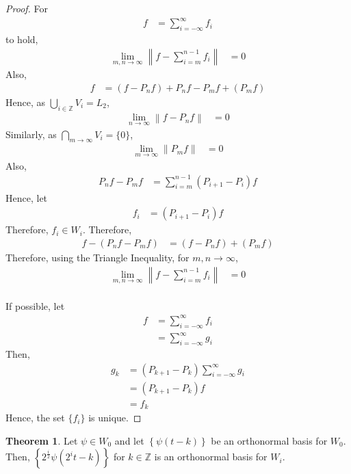 \documentclass[titlepage, fleqn, a4paper, 12pt, twoside]{article}
\theoremstyle{definition}
\theoremstyle{theorem}
\newtheorem{theorem}{Theorem}
\begin{document}
\begin{proof}
	For
	\begin{align*}
		f &= \sum\limits_{i = -\infty}^{\infty} f_i
	\end{align*}
	to hold,
	\begin{align*}
		\lim\limits_{m, n \to \infty} \left\| f - \sum\limits_{i = m}^{n - 1} f_i \right\| &= 0
	\end{align*}
	Also,
	\begin{align*}
		f &= (f - P_n f) + P_n f - P_m f + (P_m f)
	\end{align*}
	Hence, as $\bigcup_{i \in \mathbb{Z}} V_i = L_2$,
	\begin{align*}
		\lim\limits_{n \to \infty} \left\| f - P_n f \right\| &= 0
	\end{align*}
	Similarly, as $\bigcap_{m \to \infty} V_i = \{0\}$,
	\begin{align*}
		\lim\limits_{m \to \infty} \|P_m f\| &= 0
	\end{align*}
	Also,
	\begin{align*}
		P_n f - P_m f &= \sum\limits_{i = m}^{n - 1} (P_{i + 1} - P_i) f
	\end{align*}
	Hence, let
	\begin{align*}
		f_i &= (P_{i + 1} - P_i) f
	\end{align*}
	Therefore, $f_i \in W_i$.
	Therefore,
	\begin{align*}
		f - (P_n f - P_m f) &= (f - P_n f) + (P_m f)
	\end{align*}
	Therefore, using the Triangle Inequality, for $m,n \to \infty$,
	\begin{align*}
		\lim\limits_{m, n \to \infty} \left\| f - \sum\limits_{i = m}^{n - 1} f_i \right\| &= 0
	\end{align*}
	~\\
	If possible, let
	\begin{align*}
		f &= \sum\limits_{i = -\infty}^{\infty} f_i\\
		&= \sum\limits_{i = -\infty}^{\infty} g_i
	\end{align*}
	Then,
	\begin{align*}
		g_k &= (P_{k + 1} - P_k) \sum\limits_{i = -\infty}^{\infty} g_i\\
		&= (P_{k + 1} - P_k) f\\
		&= f_k
	\end{align*}
	Hence, the set $\{f_i\}$ is unique.
\end{proof}

\begin{theorem}
	Let $\psi \in W_0$ and let $\left\{ \psi(t - k) \right\}$ be an orthonormal basis for $W_0$.
	Then, $\left\{ 2^{\frac{i}{2}} \psi\left( 2^i t - k \right) \right\}$ for $k \in \mathbb{Z}$ is an orthonormal basis for $W_i$.
\end{theorem}
\end{document}
